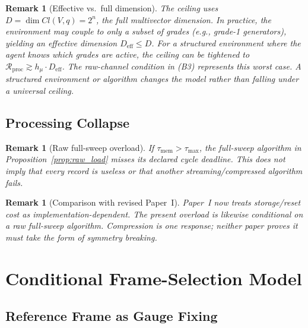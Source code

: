 \documentclass[12pt]{article}
\newtheorem{remark}[theorem]{Remark}
\begin{document}
\begin{remark}[Effective vs.\ full dimension]
\label{rem:D_eff}
The ceiling uses $D = \dim Cl(V,q) = 2^n$, the full
multivector dimension.
In practice, the environment may couple to only a subset of
grades (e.g., grade-1 generators), yielding an effective
dimension $D_{\mathrm{eff}} \leq D$.
For a \emph{structured} environment where the agent knows
which grades are active, the ceiling can be tightened to
$\mathcal{R}_{\mathrm{proc}} \gtrsim h_\mu
\cdot D_{\mathrm{eff}}$.
The raw-channel condition in (B3) represents this worst case.  A
structured environment or algorithm changes the model rather than
falling under a universal ceiling.
\end{remark}

\subsection{Processing Collapse}
\label{subsec:collapse}

\begin{remark}[Raw full-sweep overload]
\label{rem:raw_overload}
If $\tau_{\mathrm{mem}}>\tau_{\max}$, the full-sweep algorithm in
Proposition~\ref{prop:raw_load} misses its declared cycle deadline.
This does not imply that every record is useless or that another
streaming/compressed algorithm fails.
\end{remark}

\begin{remark}[Comparison with revised Paper~I]
\label{rem:comparison}
Paper~I now treats storage/reset cost as implementation-dependent.  The
present overload is likewise conditional on a raw full-sweep algorithm.
Compression is one response; neither paper proves it must take the form
of symmetry breaking.
\end{remark}

\section{Conditional Frame-Selection Model}
\label{sec:breaking}

\subsection{Reference Frame as Gauge Fixing}
\label{subsec:frame}
\end{document}
